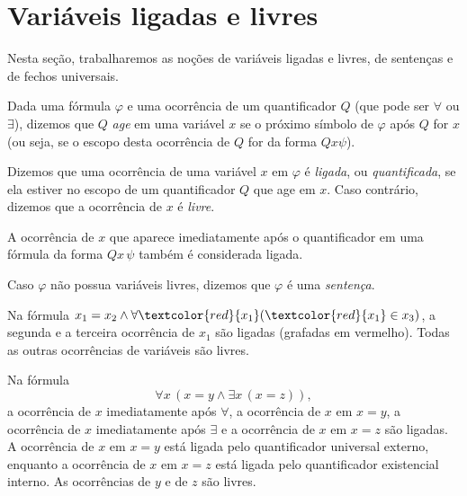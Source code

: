\section{Variáveis ligadas e livres}\label{sec:variaveisLigadasELivres}

Nesta seção, trabalharemos as noções de variáveis ligadas e livres, de sentenças e de fechos universais.

\begin{metadefinition}\label{mdef:variaveisLigadasELivres}
    Dada uma fórmula $\varphi$ e uma ocorrência de um quantificador $Q$ (que pode ser $\forall$ ou $\exists$), dizemos que $Q$ \emph{age} em uma variável $x$ se o próximo símbolo de $\varphi$ após $Q$ for $x$ (ou seja, se o escopo desta ocorrência de $Q$ for da forma $Q x \psi$).

    Dizemos que uma ocorrência de uma variável $x$ em $\varphi$ é \emph{ligada}, ou \emph{quantificada}, se ela estiver no escopo de um quantificador $Q$ que age em $x$.
    Caso contrário, dizemos que a ocorrência de $x$ é \emph{livre}.

    A ocorrência de $x$ que aparece imediatamente após o quantificador em uma fórmula da forma $Qx\,\psi$ também é considerada ligada.

    Caso $\varphi$ não possua variáveis livres, dizemos que $\varphi$ é uma \emph{sentença}.
\end{metadefinition}

\begin{example}\label{exa:variaveisLigadasELivres}
    Na fórmula $x_1 = x_2 \wedge \forall \textcolor{red}{x_1} (\textcolor{red}{x_1} \in x_3)$, a segunda e a terceira ocorrência de $x_1$ são ligadas (grafadas em vermelho).
    Todas as outras ocorrências de variáveis são livres.
\end{example}

\begin{example}\label{exa:variaveisLigadasRepetidas}
    Na fórmula
    \[
        \forall x\,(x = y \wedge \exists x\,(x = z)),
    \]
    a ocorrência de $x$ imediatamente após $\forall$, a ocorrência de $x$ em $x=y$, a ocorrência de $x$ imediatamente após $\exists$ e a ocorrência de $x$ em $x=z$ são ligadas.
    A ocorrência de $x$ em $x=y$ está ligada pelo quantificador universal externo, enquanto a ocorrência de $x$ em $x=z$ está ligada pelo quantificador existencial interno.
    As ocorrências de $y$ e de $z$ são livres.
\end{example}

